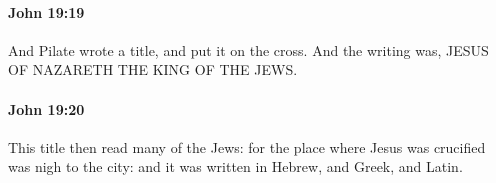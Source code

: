 		\paragraph{John 19:19} %
			\label{JOHN-19-19}

			And Pilate wrote a title, and put it on the cross. And the writing was, JESUS OF NAZARETH THE KING OF THE JEWS.

			\begin{framed}
				\scriptsize
				\begin{compactdesc}
					\item[SBLG] 
				\end{compactdesc}
			\end{framed}

		\paragraph{John 19:20} %
			\label{JOHN-19-20}

			This title then read many of the Jews: for the place where Jesus was crucified was nigh to the city: and it was written in Hebrew, and Greek, and Latin.

